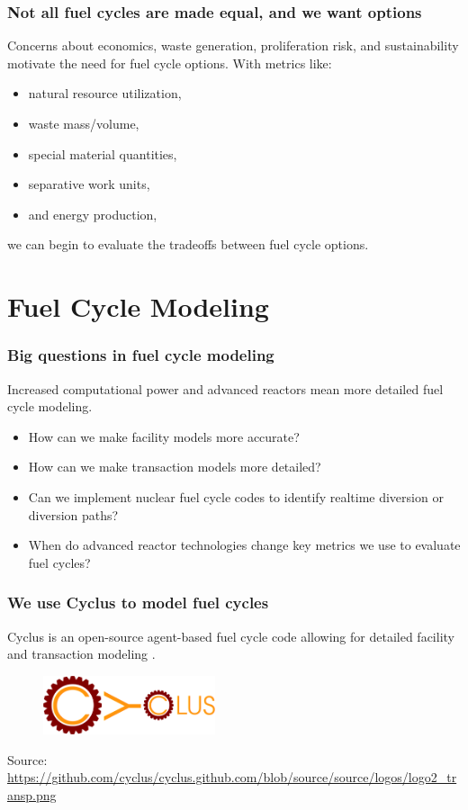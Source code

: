 \documentclass[9pt]{beamer}
\begin{document}
  \begin{frame}
      \frametitle{Not all fuel cycles are made equal, and we want options}
      Concerns about economics, waste generation, proliferation risk, and sustainability motivate the need for fuel cycle options. With metrics like:
        \begin{itemize}%
            \item natural resource utilization,
            \item waste mass/volume,
            \item special material quantities,
            \item separative work units,
            \item and energy production,
        \end{itemize}
        we can begin to evaluate the tradeoffs between fuel cycle options.
  \end{frame}

\section{Fuel Cycle Modeling}
  \begin{frame}
    \frametitle{Big questions in fuel cycle modeling}
    Increased computational power and advanced reactors mean more detailed fuel cycle modeling.
    \begin{itemize}
        \item How can we make facility models more accurate?
        \item How can we make transaction models more detailed?
        \item Can we implement nuclear fuel cycle codes to identify realtime diversion or diversion paths?
        \item When do advanced reactor technologies change key metrics we use to evaluate fuel cycles?
    \end{itemize}
  \end{frame}

  \begin{frame}
    \frametitle{We use Cyclus to model fuel cycles}
    \vspace{20pt}
    Cyclus is an open-source agent-based fuel cycle code allowing for detailed facility and transaction modeling \cite{huff_fundamental_2016}.
    \vspace{20pt}
    \begin{figure}
        \centering
        \includegraphics[width=0.45\textwidth]{../images/cyclus_logo.png}
    \end{figure}

    \vspace{37pt}
    Source: \url{https://github.com/cyclus/cyclus.github.com/blob/source/source/logos/logo2_transp.png}
  \end{frame}
\end{document}
